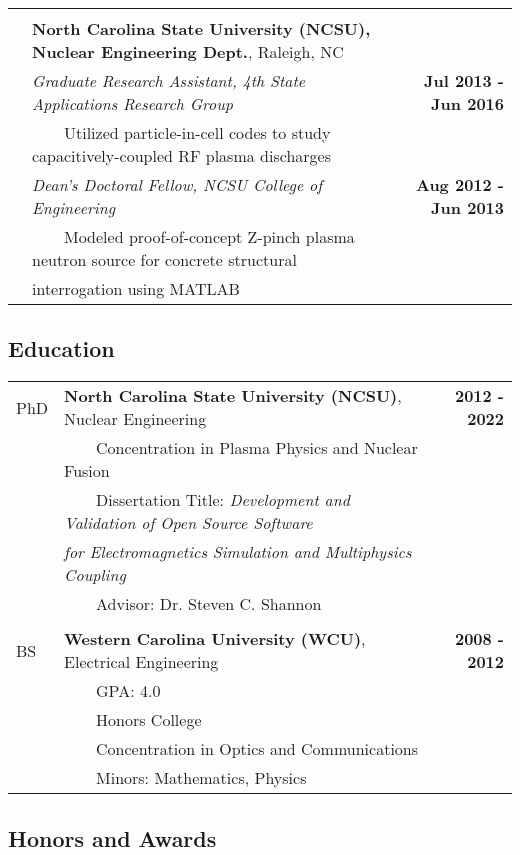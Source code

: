 \documentclass{article}
\newcommand{\tabitem}{~~\textbullet~~}
\begin{document}
\begin{tabularx}{\textwidth}{l X r}
	& & \\
	& \textbf{North Carolina State University (NCSU), Nuclear Engineering Dept.}, Raleigh, NC & \\
	& \textit{Graduate Research Assistant, 4th State Applications Research Group} & \textbf{Jul 2013 - Jun 2016} \\
	& \tabitem Utilized particle-in-cell codes to study capacitively-coupled RF plasma discharges & \\
	& \textit{Dean's Doctoral Fellow, NCSU College of Engineering} & \textbf{Aug 2012 - Jun 2013} \\
	& \tabitem Modeled proof-of-concept Z-pinch plasma neutron source for concrete structural & \\
	& \hspace{1.5em} interrogation using MATLAB & \\
\end{tabularx}

\subsection*{Education}

	\begin{tabularx}{\textwidth}{l X r}
	PhD 	 & \textbf{North Carolina State University (NCSU)}, Nuclear Engineering & \textbf{2012 - 2022} \\
				 & \tabitem Concentration in Plasma Physics and Nuclear Fusion & \\
				 & \tabitem Dissertation Title: \textit{Development and Validation of Open Source Software} & \\
				 & \hspace{1.5em} \textit{for Electromagnetics Simulation and Multiphysics Coupling} & \\
				 & \tabitem Advisor: Dr. Steven C. Shannon & \\
         & & \\
	BS		 & \textbf{Western Carolina University (WCU)}, Electrical Engineering & \textbf{2008 - 2012} \\
				 & \tabitem GPA: 4.0 & \\
				 & \tabitem Honors College & \\
				 & \tabitem Concentration in Optics and Communications & \\
				 & \tabitem Minors: Mathematics, Physics & \\
	\end{tabularx}

\subsection*{Honors and Awards}
\end{document}

